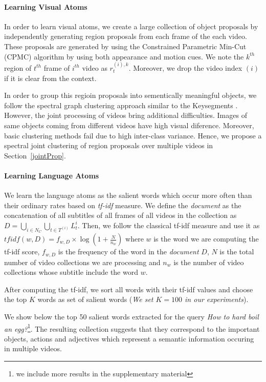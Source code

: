 \paragraph{Learning Visual Atoms}
In order to learn visual atoms, we create a large collection of object proposals by independently generating region proposals from each frame of the each video. These proposals are generated by using the Constrained Parametric Min-Cut (CPMC) \cite{cpmc} algorithm by using both appearance and motion cues. We note the $k^{th}$ region of $t^{th}$ frame of $i^{th}$ video as $r^{(i),k}_t$. Moreover, we drop the video index $(i)$ if it is clear from the context.

In order to group this regioin proposals into sementically meaningful objects, we follow the spectral graph clustering approach similar to the Keysegments \cite{keysegments}. However, the joint processing of videos bring additional difficulties. Images of same objects coming from different videos have high visual diference. Moreover, basic clustering methods fail due to high inter-class variance. Hence, we propose a spectral joint clustering of region proposals over multiple videos in Section~\ref{jointProp}.

\paragraph{Learning Language Atoms}
We learn the language atoms as the salient words which occur more often than their ordinary rates based on \emph{tf-idf} measure. We define the \emph{document} as the concatenation of all subtitles of all frames of all videos in the collection as $D=\bigcup_{i \in N_C} \bigcup_{t \in T^{(i)}} L_t^i$. Then, we follow the classical tf-idf measure and use it as $tfidf(w,D)=f_{w,D} \times \log \left( 1+ \frac{N}{n_{w}}\right)$ where $w$ is the word we are computing the tf-idf score, $f_{w,D}$ is the frequency of the word in the \emph{document} $D$, $N$ is the total number of video collections we are processing and $n_{w}$ is the number of video collections whose subtitle include the word $w$.

After computing the tf-idf, we sort all words with their tf-idf values and choose the top $K$ words as set of salient words (\emph{We set $K=100$ in our experiments}).

We show below the top 50 salient words extracted for the query \emph{How to hard boil an egg?}\footnote{we include more results in the supplementary material}. The resulting collection suggests that they correspond to the important objects, actions and adjectives which represent a semantic information occuring in multiple videos.

